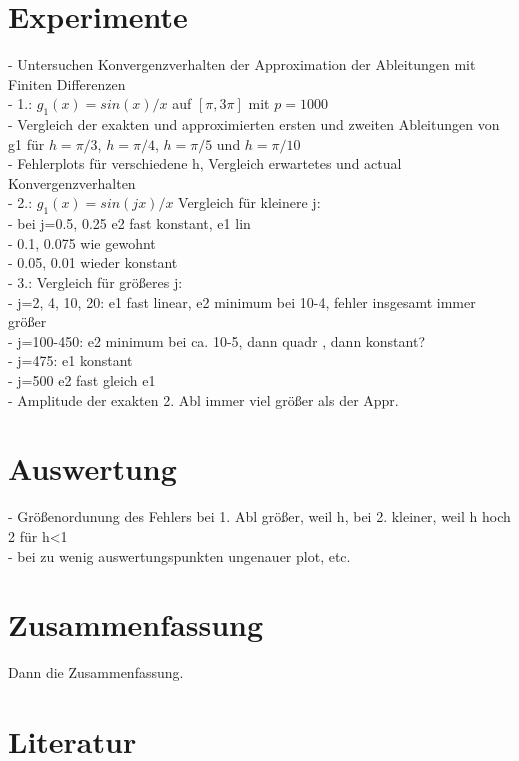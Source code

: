 \documentclass{scrartcl}
\begin{document}
\pagebreak \section{Experimente}
\label{sec:experiment}
- Untersuchen Konvergenzverhalten der Approximation der Ableitungen mit Finiten Differenzen\\
- 1.: $g_1(x)=sin(x)/x$ auf $[\pi,3\pi]$ mit $p=1000$\\
- Vergleich der exakten und approximierten ersten und zweiten Ableitungen von g1 für $h = \pi/3$, $h = \pi/4$, $h = \pi/5$ und $h = \pi/10$\\
- Fehlerplots für verschiedene h, Vergleich erwartetes und actual Konvergenzverhalten\\

- 2.: $g_1(x)=sin(jx)/x$  Vergleich für kleinere j: \\
- bei j=0.5, 0.25 e2 fast konstant, e1 lin\\
- 0.1, 0.075 wie gewohnt\\
- 0.05, 0.01 wieder konstant\\
- 3.: Vergleich für größeres j:\\
- j=2, 4, 10, 20: e1 fast linear, e2 minimum bei 10-4, fehler insgesamt immer größer\\
- j=100-450: e2 minimum bei ca. 10-5, dann quadr , dann konstant?\\
- j=475: e1 konstant\\
- j=500 e2 fast gleich e1\\

- Amplitude der exakten 2. Abl immer viel größer als der Appr.

\pagebreak \section{Auswertung}
\label{sec:auswertung}
- Größenordunung des Fehlers bei 1. Abl größer, weil h, bei 2. kleiner, weil h hoch 2 für h<1\\
- bei zu wenig auswertungspunkten ungenauer plot, etc.\\

\pagebreak \section{Zusammenfassung}
\label{sec:zusammenfassung}
Dann die Zusammenfassung.

\pagebreak \section{Literatur}
\label{sec:literatur}
\end{document}

